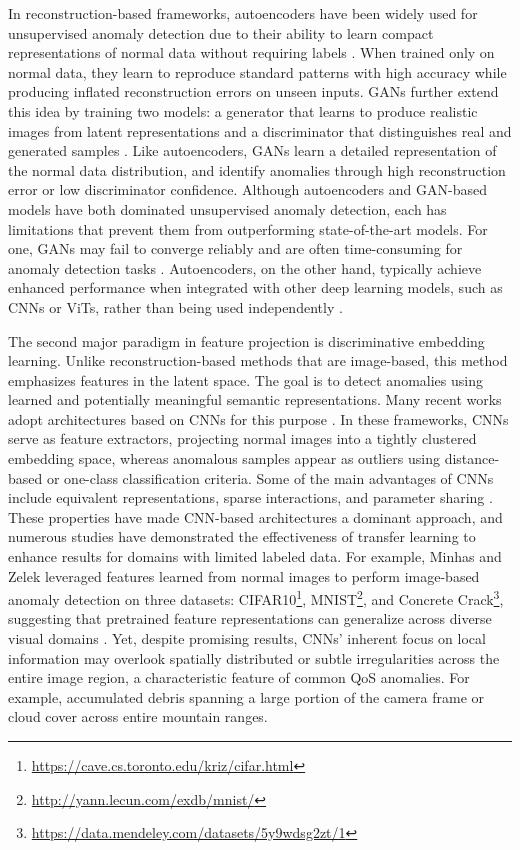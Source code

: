 \documentclass[remotesensing,article,submit,moreauthors]{Definitions/mdpi}
\begin{document}
In reconstruction-based frameworks, autoencoders have been widely used for unsupervised anomaly detection due to their ability to learn compact representations of normal data without requiring labels \cite{cheng2021improved, sakurada2014anomaly, ustek2024deep}. When trained only on normal data, they learn to reproduce standard patterns with high accuracy while producing inflated reconstruction errors on unseen inputs. \Ac{GANs} further extend this idea by training two models: a generator that learns to produce realistic images from latent representations and a discriminator that distinguishes real and generated samples \cite{Walczyna2025, xia2022gan}. Like autoencoders, \ac{GANs} learn a detailed representation of the normal data distribution, and identify anomalies through high reconstruction error or low discriminator confidence. Although autoencoders and GAN-based models have both dominated unsupervised anomaly detection, each has limitations that prevent them from outperforming state-of-the-art models. For one, \ac{GANs} may fail to converge reliably and are often time-consuming for anomaly detection tasks \cite{chen2022effectively}. Autoencoders, on the other hand, typically achieve enhanced performance when integrated with other deep learning models, such as \ac{CNNs} or \ac{ViT}s, rather than being used independently \cite{choi2022viv, lee2022anovit, yang2024unsupervised}.

The second major paradigm in feature projection is discriminative embedding learning. Unlike reconstruction-based methods that are image-based, this method emphasizes features in the latent space. The goal is to detect anomalies using learned and potentially meaningful semantic representations. Many recent works adopt architectures based on \ac{CNNs} for this purpose \cite{jain2024anomaly, minhas2019anomaly, zhou2016spatial}. In these frameworks, \ac{CNNs} serve as feature extractors, projecting normal images into a tightly clustered embedding space, whereas anomalous samples appear as outliers using distance-based or one-class classification criteria. Some of the main advantages of \ac{CNNs} include equivalent representations, sparse interactions, and parameter sharing \cite{alzubaidi2021review}. These properties have made CNN-based architectures a dominant approach, and numerous studies have demonstrated the effectiveness of transfer learning to enhance results for domains with limited labeled data. For example, Minhas and Zelek leveraged features learned from normal images to perform image-based anomaly detection on three datasets: CIFAR10\footnote{\url{https://cave.cs.toronto.edu/kriz/cifar.html}}, MNIST\footnote{\url{http://yann.lecun.com/exdb/mnist/}}, and Concrete Crack\footnote{\url{https://data.mendeley.com/datasets/5y9wdsg2zt/1}}, suggesting that pretrained feature representations can generalize across diverse visual domains \cite{minhas2019anomaly}. Yet, despite promising results, \ac{CNNs}' inherent focus on local information may overlook spatially distributed or subtle irregularities across the entire image region, a characteristic feature of common \ac{QoS} anomalies. For example, accumulated debris spanning a large portion of the camera frame or cloud cover across entire mountain ranges. 
\end{document}
